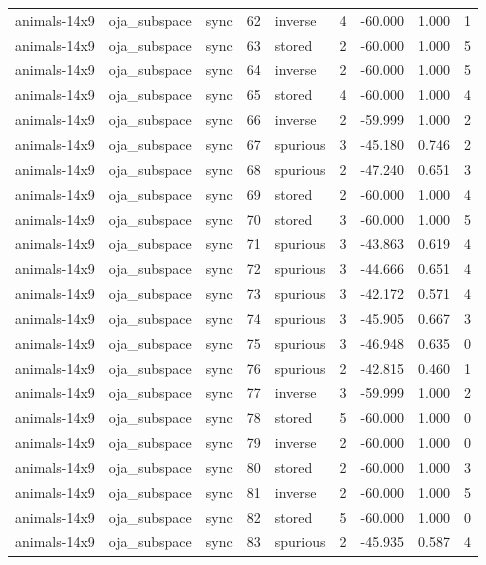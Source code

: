 \begin{tabular}{lllrlrrrr}
animals-14x9 & oja\_subspace & sync & 62 & inverse & 4 & -60.000 & 1.000 & 1 \\
animals-14x9 & oja\_subspace & sync & 63 & stored & 2 & -60.000 & 1.000 & 5 \\
animals-14x9 & oja\_subspace & sync & 64 & inverse & 2 & -60.000 & 1.000 & 5 \\
animals-14x9 & oja\_subspace & sync & 65 & stored & 4 & -60.000 & 1.000 & 4 \\
animals-14x9 & oja\_subspace & sync & 66 & inverse & 2 & -59.999 & 1.000 & 2 \\
animals-14x9 & oja\_subspace & sync & 67 & spurious & 3 & -45.180 & 0.746 & 2 \\
animals-14x9 & oja\_subspace & sync & 68 & spurious & 2 & -47.240 & 0.651 & 3 \\
animals-14x9 & oja\_subspace & sync & 69 & stored & 2 & -60.000 & 1.000 & 4 \\
animals-14x9 & oja\_subspace & sync & 70 & stored & 3 & -60.000 & 1.000 & 5 \\
animals-14x9 & oja\_subspace & sync & 71 & spurious & 3 & -43.863 & 0.619 & 4 \\
animals-14x9 & oja\_subspace & sync & 72 & spurious & 3 & -44.666 & 0.651 & 4 \\
animals-14x9 & oja\_subspace & sync & 73 & spurious & 3 & -42.172 & 0.571 & 4 \\
animals-14x9 & oja\_subspace & sync & 74 & spurious & 3 & -45.905 & 0.667 & 3 \\
animals-14x9 & oja\_subspace & sync & 75 & spurious & 3 & -46.948 & 0.635 & 0 \\
animals-14x9 & oja\_subspace & sync & 76 & spurious & 2 & -42.815 & 0.460 & 1 \\
animals-14x9 & oja\_subspace & sync & 77 & inverse & 3 & -59.999 & 1.000 & 2 \\
animals-14x9 & oja\_subspace & sync & 78 & stored & 5 & -60.000 & 1.000 & 0 \\
animals-14x9 & oja\_subspace & sync & 79 & inverse & 2 & -60.000 & 1.000 & 0 \\
animals-14x9 & oja\_subspace & sync & 80 & stored & 2 & -60.000 & 1.000 & 3 \\
animals-14x9 & oja\_subspace & sync & 81 & inverse & 2 & -60.000 & 1.000 & 5 \\
animals-14x9 & oja\_subspace & sync & 82 & stored & 5 & -60.000 & 1.000 & 0 \\
animals-14x9 & oja\_subspace & sync & 83 & spurious & 2 & -45.935 & 0.587 & 4 \\

\end{tabular}
